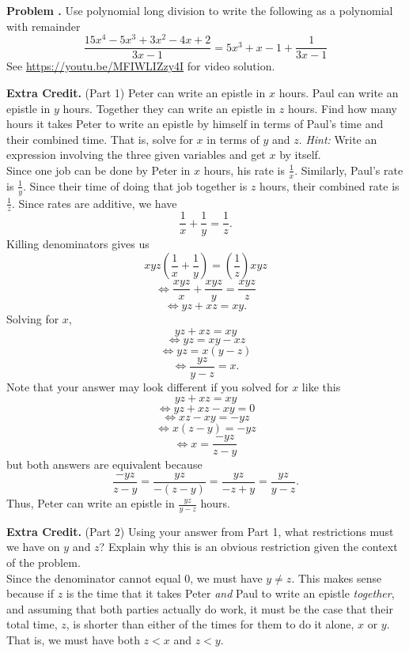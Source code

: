 \documentclass[11pt,letterpaper]{article}
\newcounter{problem}
\newcommand{\problem}{
	\stepcounter{problem}%
	\noindent \textbf{ Problem \theproblem. }        
}
\newcommand{\excred}{\noindent\textbf{Extra Credit. }}
\begin{document}
\vspace{.5cm}


\problem Use polynomial long division to write the following as a polynomial with remainder 
$$ \frac{15x^4 - 5x^3 + 3x^2 - 4x + 2}{3x - 1} = 5x^3 + x - 1 + \frac{1}{3x-1} $$
See \url{https://youtu.be/MFIWLIZzy4I} for video solution.

\vspace{.5cm}



\excred (Part 1) Peter can write an epistle in $x$ hours. Paul can write an epistle in $y$ hours. Together they can write an epistle in $z$ hours. Find how many hours it takes Peter to write an epistle by himself in terms of Paul's time and their combined time. That is, solve for $x$ in terms of $y$ and $z$. \textit{Hint:} Write an expression involving the three given variables and get $x$ by itself. 
\\

Since one job can be done by Peter in $x$ hours, his rate is $\frac{1}{x}$. Similarly, Paul's rate is $\frac{1}{y}$. Since their time of doing that job together is $z$ hours, their combined rate is $\frac{1}{z}$. Since rates are additive, we have
$$ \frac{1}{x} + \frac{1}{y} = \frac{1}{z}. $$
Killing denominators gives us
$$ xyz \left(\frac{1}{x} + \frac{1}{y}\right) = \left(\frac{1}{z}\right) xyz$$
$$ \iff \frac{xyz}{x} + \frac{xyz}{y} = \frac{xyz}{z} $$
$$ \iff yz + xz = xy.$$
Solving for $x$,
$$ yz + xz = xy$$
$$ \iff yz = xy - xz$$
$$ \iff yz = x(y - z)$$
$$ \iff \frac{yz}{y-z} = x.$$
Note that your answer may look different if you solved for $x$ like this
$$ yz + xz = xy$$
$$ \iff yz + xz - xy = 0$$
$$ \iff xz - xy = -yz$$
$$ \iff x(z - y) = - yz$$
$$ \iff x = \frac{-yz}{z - y}$$
but both answers are equivalent because
$$ \frac{-yz}{z - y} =  \frac{yz}{-(z-y)} = \frac{yz}{-z+y} = \frac{yz}{y-z}.$$
Thus, Peter can write an epistle in $\frac{yz}{y-z}$ hours.

\vspace{.5cm}

\excred (Part 2) Using your answer from Part 1, what restrictions must we have on $y$ and $z$? Explain why this is an obvious restriction given the context of the problem.
\\

Since the denominator cannot equal $0$, we must have $y \neq z$. This makes sense because if $z$ is the time that it takes Peter \textit{and} Paul to write an epistle \textit{together}, and assuming that both parties actually do work, it must be the case that their total time, $z$, is shorter than either of the times for them to do it alone, $x$ or $y$. That is, we must have both $z < x$ and $z < y$.
\\
\end{document}
